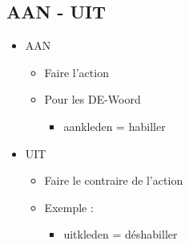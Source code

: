 \documentclass[a4paper]{article}
\begin{document}
\subsection{AAN - UIT}
\begin{itemize}[label=\textbullet, font=\Large]
  \item AAN
  \begin{itemize}[label=, font=\scriptsize]
    \item Faire l'action
    \item Pour les DE-Woord
    \begin{itemize}
      \item aankleden = habiller
    \end{itemize}
  \end{itemize} 
  \item UIT
  \begin{itemize}[label=, font=\scriptsize]
    \item Faire le contraire de l'action
    \item Exemple :
    \begin{itemize}
      \item uitkleden = déshabiller
    \end{itemize}
  \end{itemize} 
\end{itemize}
\end{document}

